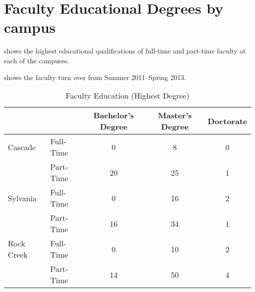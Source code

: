 \chapter{Faculty Educational Degrees by campus}\label{app:sec:facultyDegrees}

 shows the highest educational 
qualifications of full-time and part-time faculty at each of the campuses.

 shows the faculty turn over from 
Summer 2011--Spring 2013.

\begin{table}[!htb]
	\centering
	\caption{Faculty Education (Highest Degree)}
	\label{app:tab:facultyDegrees}
	\begin{tabular}{ll*{3}{c}}
		\toprule
		 & & Bachelor's Degree & Master's Degree & Doctorate \\
		\midrule
		Cascade    & Full-Time & 0  & 8  & 0 \\
		           & Part-Time & 20 & 25 & 1 \\
		\cmidrule{2-5}
		Sylvania   & Full-Time & 0  & 16 & 2 \\
		           & Part-Time & 16 & 34 & 1 \\
		\cmidrule{2-5}
		Rock Creek & Full-Time & 0  & 10 & 2 \\
		           & Part-Time & 14 & 50 & 4 \\
		\bottomrule
	\end{tabular}
\end{table}

